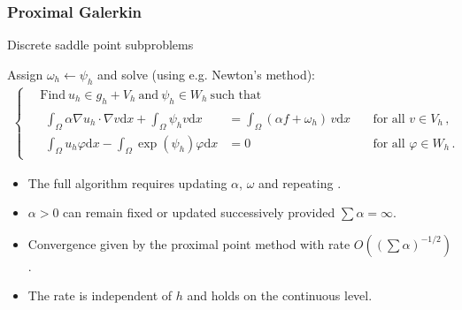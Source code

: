 \documentclass[aspectratio=169,xcolor=dvipsnames,11pt]{beamer}
\newcommand{\dd}{\mathrm{d}}
\newcommand{\fa}{\text{for all }}
\begin{document}
\begin{frame}\frametitle{Proximal Galerkin}{\small
\begin{algorithm2e}[H]
\DontPrintSemicolon
	\caption{\label{alg:EntropicGalerkinIntro} 	Discrete saddle point subproblems}
	{
		Assign $\omega_h \leftarrow \psi_{h}$ and solve (using e.g. Newton's method):
		\vspace{-2ex}
		\begin{gather*}
			\left\{
			\begin{aligned}
				\,&\text{Find}~
				u_{h}\in g_h + V_{h} ~\text{and}~\psi_{h} \in W_{h}
				~\text{such that~}
				\\
				&\begin{alignedat}{4}
					\int_\Omega \alpha \nabla u_h\cdot \nabla v \dd x + \int_\Omega \psi_h v \dd x &= \int_\Omega (\alpha f + \omega_h)\, v \dd x
					&&~\fa v \in V_h
					\,,
					\\
					\int_\Omega u_h \varphi \dd x - \int_\Omega \exp(\psi_h) \varphi \dd x &= 0
					&&~\fa \varphi \in W_h 
					\,.
				\end{alignedat}
			\end{aligned}
			\right.
		\end{gather*}
		\;
		\vspace*{-\baselineskip} \vspace{-2ex}
	}
\end{algorithm2e}
}
{\small
\begin{itemize}
\item The \alert{full algorithm} requires updating $\alpha$, $\omega$ and repeating .
\item $\alpha > 0$ \alert{can remain fixed} or updated successively provided  $\sum \alpha = \infty$.
\item \alert{Convergence} given by the  proximal point method with \alert{rate} $O((\sum \alpha)^{-1/2})$.
\item The rate \alert{is independent of $h$} and holds on the continuous level. 
\end{itemize}
}
\end{frame}
\end{document}
